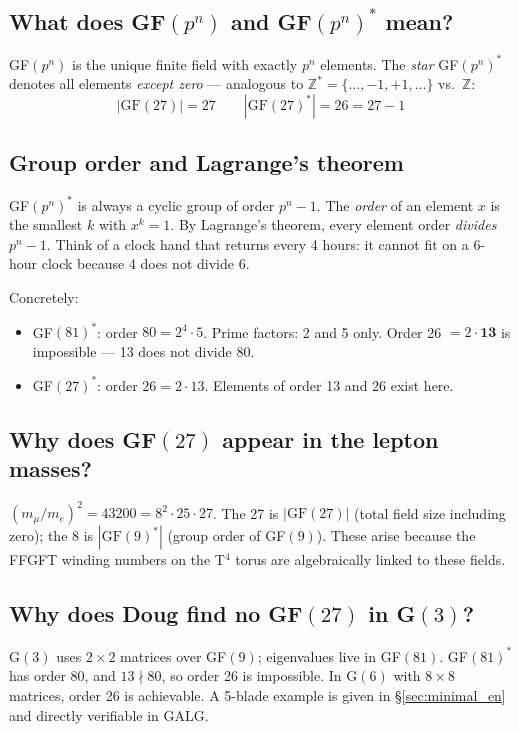 \subsection*{What does GF$(p^n)$ and GF$(p^n)^*$ mean?}

GF$(p^n)$ is the unique finite field with exactly $p^n$ elements.
The \emph{star} GF$(p^n)^*$ denotes all elements \emph{except zero} ---
analogous to $\mathbb{Z}^* = \{\ldots,-1,+1,\ldots\}$ vs.\ $\mathbb{Z}$:
\begin{equation*}
  |\text{GF}(27)| = 27 \qquad |\text{GF}(27)^*| = 26 = 27-1
\end{equation*}

\subsection*{Group order and Lagrange's theorem}

GF$(p^n)^*$ is always a cyclic group of order $p^n-1$.
The \emph{order} of an element $x$ is the smallest $k$ with $x^k = 1$.
By Lagrange's theorem, every element order \emph{divides} $p^n - 1$.
Think of a clock hand that returns every 4 hours: it cannot fit on a
6-hour clock because 4 does not divide 6.

Concretely:
\begin{itemize}
  \item GF$(81)^*$: order $80 = 2^4 \cdot 5$. Prime factors: 2 and 5 only.
        Order 26 $= 2\cdot\mathbf{13}$ is impossible --- 13 does not divide 80.
  \item GF$(27)^*$: order $26 = 2 \cdot 13$. Elements of order 13 and 26 exist here.
\end{itemize}

\subsection*{Why does GF$(27)$ appear in the lepton masses?}

$(m_\mu/m_e)^2 = 43200 = 8^2 \cdot 25 \cdot 27$.
The 27 is $|\text{GF}(27)|$ (total field size including zero);
the 8 is $|\text{GF}(9)^*|$ (group order of GF$(9)$).
These arise because the FFGFT winding numbers on the T$^4$ torus
are algebraically linked to these fields.

\subsection*{Why does Doug find no GF$(27)$ in G$(3)$?}

G$(3)$ uses $2\times2$ matrices over GF$(9)$; eigenvalues live in GF$(81)$.
GF$(81)^*$ has order 80, and $13 \nmid 80$, so order 26 is impossible.
In G$(6)$ with $8\times8$ matrices, order 26 is achievable.
A 5-blade example is given in §\ref{sec:minimal_en} and directly
verifiable in GALG.

